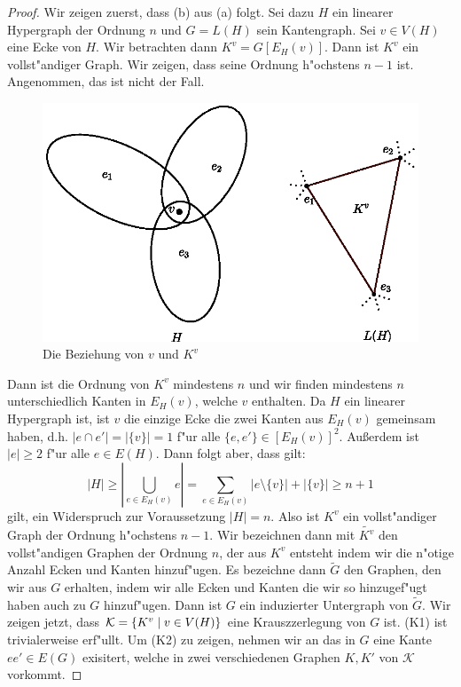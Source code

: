 \begin{proof}
  Wir zeigen zuerst, dass (b) aus (a) folgt. Sei dazu $H$ ein linearer Hypergraph der Ordnung $n$ und $G=L(H)$ sein Kantengraph. Sei $v\in V(H)$ eine Ecke von $H$. Wir betrachten dann $K^{v} = G[E_H(v)]$. Dann ist $K^{v}$ ein vollst"andiger Graph. Wir zeigen, dass seine Ordnung h"ochstens $n-1$ ist. Angenommen, das ist nicht der Fall. 
\begin{figure}[h]
  \centering
  \includegraphics{images/KvLinegraph.eps}
  \caption{Die Beziehung von $v$ und $K^{v}$}
  \label{fig:kvlinegraph}
\end{figure}
  Dann ist die Ordnung von $K^{v}$ mindestens $n$ und wir finden mindestens $n$ unterschiedlich Kanten in $E_H(v)$, welche $v$ enthalten. 
  Da $H$ ein linearer Hypergraph ist, ist $v$ die einzige Ecke die zwei Kanten aus $E_{H}(v)$ gemeinsam haben, d.h. $|e\cap e'| = |\{ v \}| = 1$ f"ur alle $\{e,e'\} \in [E_H(v)]^{2}$. Au{\ss}erdem ist $|e| \geq 2$ f"ur alle $e\in E(H)$. 
  Dann folgt aber, dass gilt: $$|H| \geq |\bigcup\limits_{e\in E_H(v)} e| = \sum\limits_{e\in E_{H}(v)} |e\setminus \{v\}|+ | \{v\}| \geq n+1$$ gilt, ein Widerspruch zur Voraussetzung $|H| = n$. 
  Also ist $K^{v}$ ein vollst"andiger Graph der Ordnung h"ochstens $n-1$. Wir bezeichnen dann mit $\tilde{K^{v}}$ den vollst"andigen Graphen der Ordnung $n$, der aus $K^{v}$ entsteht indem wir die n"otige Anzahl Ecken und Kanten hinzuf"ugen. 
  Es bezeichne dann $\tilde{G}$ den Graphen, den wir aus $G$ erhalten, indem wir alle Ecken und Kanten die wir so hinzugef"ugt haben auch zu $G$ hinzuf"ugen. 
  Dann ist $G$ ein induzierter Untergraph von $\tilde{G}$. 
  Wir zeigen jetzt, dass $\mathcal{K}= \{K^{v} \;|\; v\in V(H) \}$ eine Krauszzerlegung von $G$ ist. 
  (K1) ist trivialerweise erf"ullt. Um (K2) zu zeigen, nehmen wir an das in $G$ eine Kante $ee'\in E(G)$ exisitert, welche in zwei verschiedenen Graphen $K,K'$ von $\mathcal{K}$ vorkommt.

\end{proof}
